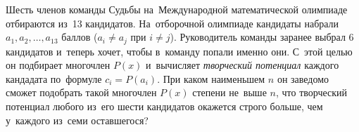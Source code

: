 \begin{problems}
\item
Шесть членов команды Судьбы на~Международной математической олимпиаде
отбираются из~13 кандидатов.
На~отборочной олимпиаде кандидаты набрали $a_1, a_2, \ldots, a_{13}$ баллов
($a_i \neq a_j$ при $i \neq j$).
Руководитель команды заранее выбрал 6 кандидатов и~теперь хочет, чтобы
в~команду попали именно они.
С~этой целью он подбирает многочлен $P(x)$ и~вычисляет \emph{творческий
потенциал} каждого кандадата по~формуле $c_i = P(a_i)$.
При каком наименьшем $n$ он заведомо сможет подобрать такой многочлен $P(x)$
степени не~выше $n$, что творческий потенциал любого из~его шести кандидатов
окажется строго больше, чем у~каждого из~семи оставшегося?

\end{problems}

